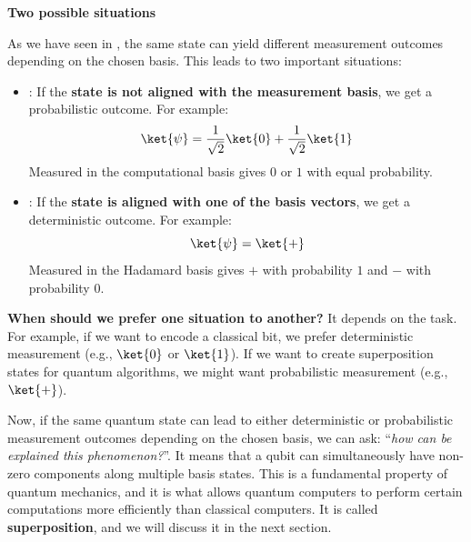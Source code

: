 \highspace
\begin{flushleft}
    \textcolor{Green3}{ \textbf{Two possible situations}}
\end{flushleft}
As we have seen in , the same state can yield different measurement outcomes depending on the chosen basis. This leads to two important situations:
\begin{itemize}
    \item {}: If the \textbf{state is not aligned with the measurement basis}, we get a probabilistic outcome. For example:
    \begin{equation*}
        \ket{\psi} = \frac{1}{\sqrt{2}}\ket{0} + \frac{1}{\sqrt{2}}\ket{1}
    \end{equation*}
    Measured in the computational basis gives $0$ or $1$ with equal probability.

    \item {}: If the \textbf{state is aligned with one of the basis vectors}, we get a deterministic outcome. For example:
    \begin{equation*}
        \ket{\psi} = \ket{+}
    \end{equation*}
    Measured in the Hadamard basis gives $+$ with probability $1$ and $-$ with probability $0$.
\end{itemize}
\textcolor{Green3}{ \textbf{When should we prefer one situation to another?}} It depends on the task. For example, if we want to encode a classical bit, we prefer deterministic measurement (e.g., $\ket{0}$ or $\ket{1}$). If we want to create superposition states for quantum algorithms, we might want probabilistic measurement (e.g., $\ket{+}$).

\highspace
Now, if the same quantum state can lead to either deterministic or probabilistic measurement outcomes depending on the chosen basis, we can ask: ``\emph{how can be explained this phenomenon?}''. It means that a qubit can simultaneously have non-zero components along multiple basis states. This is a fundamental property of quantum mechanics, and it is what allows quantum computers to perform certain computations more efficiently than classical computers. It is called \textbf{superposition}, and we will discuss it in the next section.